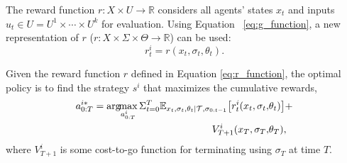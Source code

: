 \documentclass[letterpaper, 10 pt, conference]{ieeeconf}  %
\newcommand{\argmax}{\arg\!\!\max}
\begin{document}
The reward function $r: X \times U \rightarrow \mathbb{R}$ considers all agents' states $x_t$ and inputs $u_t \in U = U^1\times \cdots \times U^k$ for evaluation. Using Equation ~\ref{eq:g_function}, a new representation of $r$ ($r:X\times \Sigma \times \Theta \rightarrow \mathbb{R}$) can be used:
\begin{equation}\label{eq:r_function}
r^i_t = r(x_t,\sigma_t,\theta_t).
\end{equation}



Given the reward function $r$ defined in Equation \ref{eq:r_function}, the optimal 
policy is to find the strategy $s^i$ that maximizes the cumulative rewards,
\begin{equation}\label{eq:optimal}
\begin{aligned}
  a^{i*}_{0:T} = \argmax_{a^i_{0:T}} 
  \Sigma_{t=0}^{T} 
  \mathbb{E}_{x_t,\sigma_{t},\theta_t|\mathcal{T},\sigma_{0:t-1}} \big{[}
  r^i_t(x_t,\sigma_t,&\theta_t)\big{]}+ \\ 
  V^i_{T+1}(x_T,\sigma_T,&\theta_T), 
\end{aligned}
\end{equation}
where $V^i_{T+1}$ is some cost-to-go function for terminating using $\sigma_T$ at 
time $T$.
\end{document}
